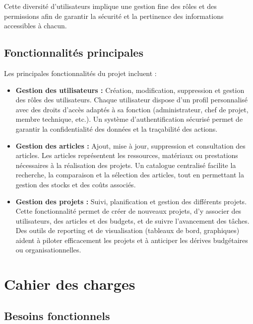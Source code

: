 \documentclass[12pt,a4paper]{report}
\begin{document}
Cette diversité d’utilisateurs implique une gestion fine des rôles et des permissions afin de garantir la sécurité et la pertinence des informations accessibles à chacun.
\section{Fonctionnalités principales}
Les principales fonctionnalités du projet incluent :
\begin{itemize}
    \item \textbf{Gestion des utilisateurs :} Création, modification, suppression et gestion des rôles des utilisateurs. Chaque utilisateur dispose d’un profil personnalisé avec des droits d’accès adaptés à sa fonction (administrateur, chef de projet, membre technique, etc.). Un système d’authentification sécurisé permet de garantir la confidentialité des données et la traçabilité des actions.
    \item \textbf{Gestion des articles :} Ajout, mise à jour, suppression et consultation des articles. Les articles représentent les ressources, matériaux ou prestations nécessaires à la réalisation des projets. Un catalogue centralisé facilite la recherche, la comparaison et la sélection des articles, tout en permettant la gestion des stocks et des coûts associés.
    \item \textbf{Gestion des projets :} Suivi, planification et gestion des différents projets. Cette fonctionnalité permet de créer de nouveaux projets, d’y associer des utilisateurs, des articles et des budgets, et de suivre l’avancement des tâches. Des outils de reporting et de visualisation (tableaux de bord, graphiques) aident à piloter efficacement les projets et à anticiper les dérives budgétaires ou organisationnelles.
\end{itemize}

\chapter{Cahier des charges}
\section{Besoins fonctionnels}
\end{document}
